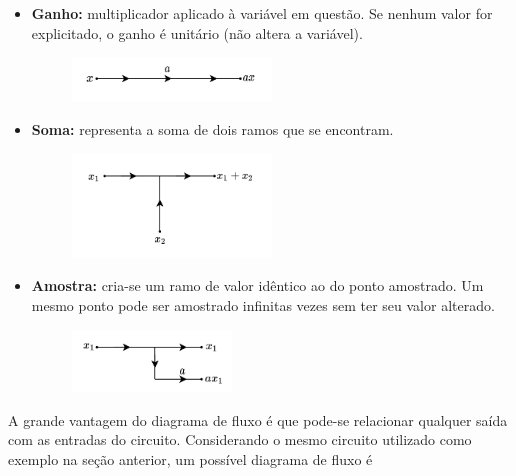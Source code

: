 \documentclass{article}
\numberwithin{equation}{section}
\begin{document}
\begin{itemize}
    \item \textbf{Ganho:} multiplicador aplicado à variável em questão. Se nenhum valor for explicitado, o ganho é unitário (não altera a variável).

    \begin{figure}[H]
        \centering
        \includegraphics[width=0.5\textwidth]{img/mason/ganho.png}
    \end{figure}

    \item \textbf{Soma:} representa a soma de dois ramos que se encontram.

    \begin{figure}[H]
        \centering
        \includegraphics[width=0.5\textwidth]{img/mason/soma.png}
    \end{figure}

    \item \textbf{Amostra:} cria-se um ramo de valor idêntico ao do ponto amostrado. Um mesmo ponto pode ser amostrado infinitas vezes sem ter seu valor alterado.

    \begin{figure}[H]
        \centering
        \includegraphics[width=0.4\textwidth]{img/mason/amostra.png}
    \end{figure}

\end{itemize}
A grande vantagem do diagrama de fluxo é que pode-se relacionar qualquer saída com as entradas do circuito. Considerando o mesmo circuito utilizado como exemplo na seção anterior, um possível diagrama de fluxo é
\end{document}
